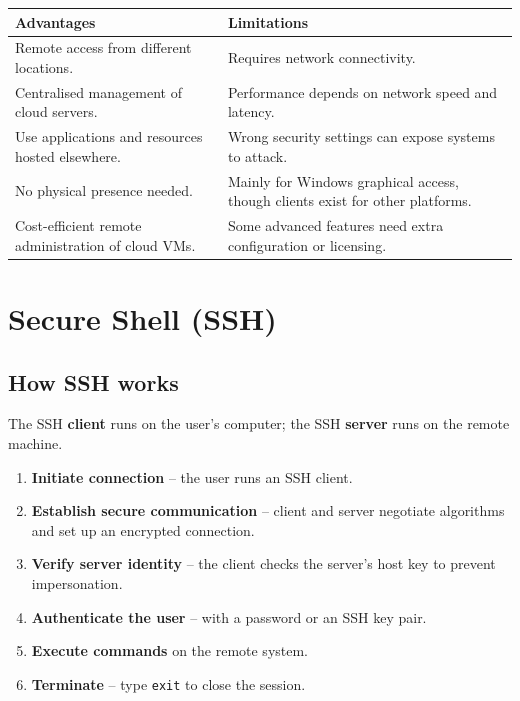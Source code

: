 \documentclass[11pt,a4paper]{article}
\begin{document}

\begin{tabularx}{\textwidth}{@{}XX@{}}
\toprule
\rowcolor{tablehead}\textbf{Advantages} & \textbf{Limitations} \\
\midrule
Remote access from different locations. & Requires network connectivity. \\
Centralised management of cloud servers. & Performance depends on network speed and
  latency. \\
Use applications and resources hosted elsewhere. & Wrong security settings can expose systems
  to attack. \\
No physical presence needed. & Mainly for Windows graphical access, though clients exist for
  other platforms. \\
Cost-efficient remote administration of cloud VMs. & Some advanced features need extra
  configuration or licensing. \\
\bottomrule
\end{tabularx}

\section{Secure Shell (SSH)}


\subsection{How SSH works}

The SSH \textbf{client} runs on the user's computer; the SSH \textbf{server} runs on the
remote machine.


\begin{enumerate}\itemsep2pt
  \item \textbf{Initiate connection} -- the user runs an SSH client.
  \item \textbf{Establish secure communication} -- client and server negotiate algorithms and
        set up an encrypted connection.
  \item \textbf{Verify server identity} -- the client checks the server's host key to prevent
        impersonation.
  \item \textbf{Authenticate the user} -- with a password or an SSH key pair.
  \item \textbf{Execute commands} on the remote system.
  \item \textbf{Terminate} -- type \texttt{exit} to close the session.
\end{enumerate}
\end{document}
